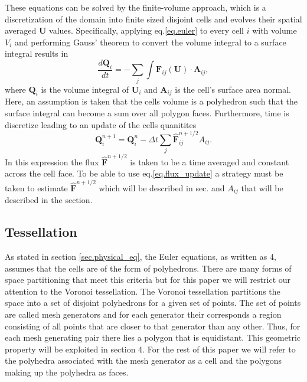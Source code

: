 These equations can be solved by the finite-volume approach, which is a discretization
of the domain into finite sized disjoint cells and evolves their spatial averaged
$\mathbf{U}$ values. Specifically, applying eq.\ref{eq.euler} to every cell $i$ with
volume $V_i$ and performing Gauss' theorem to convert the volume integral to a
surface integral results in
%
\begin{equation}
    \label{eq.euler_int}
    \frac{d\mathbf{Q}_i}{dt} =
    -\sum_{j}\int\mathbf{F}_{ij}(\mathbf{U})\cdot\mathbf{A}_{ij},
\end{equation}
%
where $\mathbf{Q}_i$ is the volume integral of $\mathbf{U}_i$ and $\mathbf{A}_{ij}$ is the
cell's surface area normal. Here, an assumption is taken that the cells volume is a polyhedron
such that the surface integral can become a sum over all polygon faces. Furthermore, time
is discretize leading to an update of the cells quanitites
%
\begin{equation}
    \label{eq.flux_update}
    \mathbf{Q}_i^{n+1} = \mathbf{Q}_i^n - \Delta t\sum_j \mathbf{\hat{F}}_{ij}^{n+1/2} A_{ij}.
\end{equation}
%
In this expression the flux $\mathbf{\hat{F}}^{n+1/2}$ is taken to be a time averaged and
constant across the cell face. To be able to use eq.\ref{eq.flux_update} a strategy must
be taken to estimate $\mathbf{\hat{F}}^{n+1/2}$ which will be described in sec. and $A_{ij}$
that will be described in the section.

\subsection{Tessellation}
As stated in section \ref{sec.physical_eq}, the Euler equations, as written as 4, assumes that the cells are of the
form of polyhedrons. There are many forms of space partitioning that meet this criteria but for
this paper we will restrict our attention to the Voronoi tessellation. The Voronoi tessellation
partitions the space into a set of disjoint polyhedrons for a given set of points. The set of
points are called mesh generators and for each generator their corresponds a region consisting of
all points that are closer to that generator than any other. Thus, for each mesh generating pair
there lies a polygon that is equidistant. This geometric property will be exploited in section 4.
For the rest of this paper we will refer to the polyhedra associated with the mesh generator as 
a cell and the polygons making up the polyhedra as faces.

